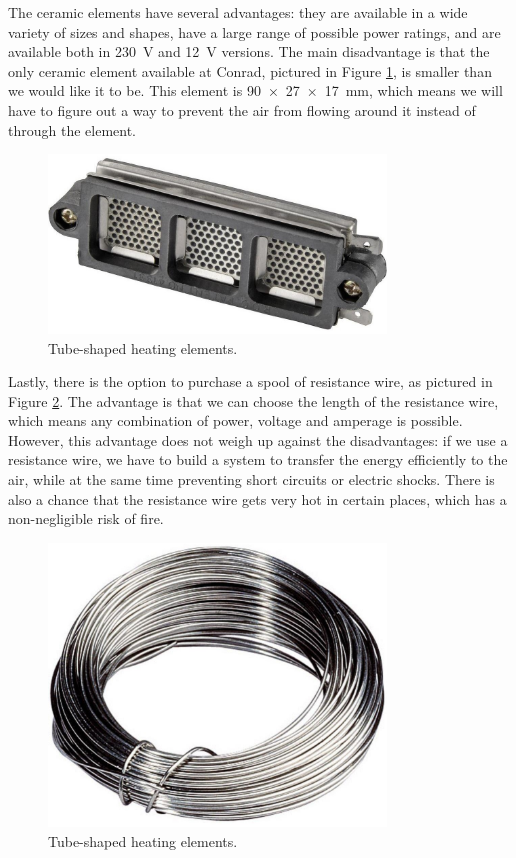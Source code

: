 \documentclass[a4paper,oneside]{book}
\begin{document}
The ceramic elements have several advantages: they are available in a wide
variety of sizes and shapes, have a large range of possible power ratings, and
are available both in \SI{230}{\V} and \SI{12}{\V} versions. The main
disadvantage is that the only ceramic element available at Conrad, pictured in
Figure \ref{fig:ceramic-heating}, is smaller than we would like it to be. This
element is \SI{90x27x17}{\mm}, which means we will have to figure out a way to
prevent the air from flowing around it instead of through the element.

\begin{figure}[h]
\centering
\includegraphics[width=0.8\textwidth]{images/ceramic-heater.jpg}
\caption{Tube-shaped heating elements. \protect\cite{ceramic-heater}}
\label{fig:ceramic-heating}
\end{figure}

Lastly, there is the option to purchase a spool of resistance wire, as pictured
in Figure \ref{fig:wire-heating}. The advantage is that we can choose the length of the
resistance wire, which means any combination of power, voltage and amperage is
possible. However, this advantage does not weigh up against the disadvantages:
if we use a resistance wire, we have to build a system to transfer the energy
efficiently to the air, while at the same time preventing short circuits or
electric shocks. There is also a chance that the resistance wire gets very hot
in certain places, which has a non-negligible risk of fire.

\begin{figure}[h]
\centering
\includegraphics[width=0.8\textwidth]{images/wire-heater.jpg}
\caption{Tube-shaped heating elements. \protect\cite{wire-heater}}
\label{fig:wire-heating}
\end{figure}
\end{document}
